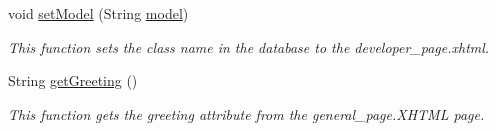 \begin{DoxyCompactItemize}
void \hyperlink{classorg_1_1jboss_1_1as_1_1quickstarts_1_1greeter_1_1web_1_1_general_controller_aa51eb6bd4f5cb601c588718e56246238}{set\+Model} (String \hyperlink{classorg_1_1jboss_1_1as_1_1quickstarts_1_1greeter_1_1web_1_1_general_controller_abf9187f42f1b40ee43bc308b6166eeb1}{model})
\begin{DoxyCompactList}\small\item\em This function sets the class name in the database to the developer\+\_\+page.\+xhtml. \end{DoxyCompactList}\item 
String \hyperlink{classorg_1_1jboss_1_1as_1_1quickstarts_1_1greeter_1_1web_1_1_general_controller_afee1b5acfd689b560ed5ed87bb78dac4}{get\+Greeting} ()
\begin{DoxyCompactList}\small\item\em This function gets the greeting attribute from the general\+\_\+page.\+X\+H\+T\+ML page. \end{DoxyCompactList}\end{DoxyCompactItemize}
